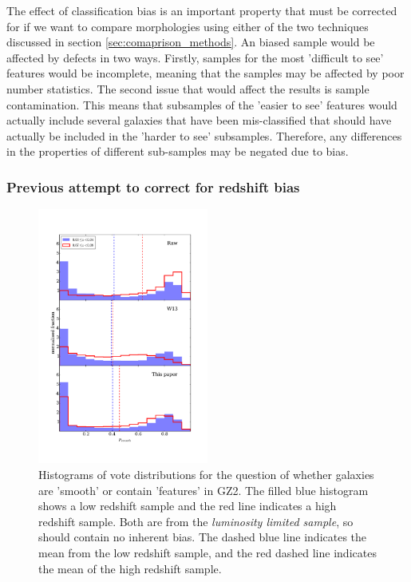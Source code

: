 \documentclass[useAMS,usenatbib]{mn2e}
\begin{document}
The effect of classification bias is an important property that must be corrected for if we want to compare morphologies using either of the two techniques discussed in section \ref{sec:comaprison_methods}. An biased sample would be affected by defects in two ways. Firstly, samples for the most 'difficult to see' features would be incomplete, meaning that the samples may be affected by poor number statistics. The second issue that would affect the results is sample contamination. This means that subsamples of the 'easier to see' features would actually include several galaxies that have been mis-classified that should have actually be included in the 'harder to see' subsamples. Therefore, any differences in the properties of different sub-samples may be negated due to bias.

\subsubsection{Previous attempt to correct for redshift bias}
\label{sec:previous_method}

\begin{figure}
		\centering
		
        \includegraphics[width=0.5\textwidth]{Data_imgs/vote_distribution_histograms.pdf}
		
        \caption{Histograms of vote distributions for the question of whether galaxies are 'smooth' or contain 'features' in GZ2. The filled blue histogram shows a low redshift sample and the red line indicates a high redshift sample. Both are from the \textit{luminosity limited sample}, so should contain no inherent bias. The dashed blue line indicates the mean from the low redshift sample, and the red dashed line indicates the mean of the high redshift sample.}
		
        \label{fig:vote_histograms}
        
\end{figure}
\end{document}
